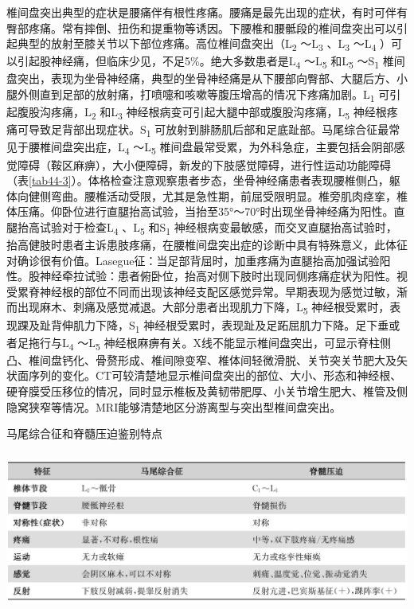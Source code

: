 椎间盘突出典型的症状是腰痛伴有根性疼痛。腰痛是最先出现的症状，有时可伴有臀部疼痛。常有摔倒、扭伤和提重物等诱因。下腰椎和腰骶段的椎间盘突出可以引起典型的放射至膝关节以下部位疼痛。高位椎间盘突出（L\textsubscript{2}
～L\textsubscript{3} 、L\textsubscript{3} ～L\textsubscript{4}
）可以引起股神经痛，但临床少见，不足5\%。绝大多数患者是L\textsubscript{4}
～L\textsubscript{5} 和L\textsubscript{5} ～S\textsubscript{1}
椎间盘突出，表现为坐骨神经痛，典型的坐骨神经痛是从下腰部向臀部、大腿后方、小腿外侧直到足部的放射痛，打喷嚏和咳嗽等腹压增高的情况下疼痛加剧。L\textsubscript{1}
可引起腹股沟疼痛，L\textsubscript{2} 和L\textsubscript{3}
神经根病变可引起大腿中部或腹股沟疼痛，L\textsubscript{5}
神经根疼痛可导致足背部出现症状。S\textsubscript{1}
可放射到腓肠肌后部和足底趾部。马尾综合征最常见于腰椎间盘突出症，L\textsubscript{4}
～L\textsubscript{5}
椎间盘最常受累，为外科急症，主要包括会阴部感觉障碍（鞍区麻痹），大小便障碍，新发的下肢感觉障碍，进行性运动功能障碍（表\ref{tab44-3}）。体格检查注意观察患者步态，坐骨神经痛患者表现腰椎侧凸，躯体向健侧弯曲。腰椎活动受限，尤其是急性期，前屈受限明显。椎旁肌肉痉挛，椎体压痛。仰卧位进行直腿抬高试验，当抬至35°～70°时出现坐骨神经痛为阳性。直腿抬高试验对于检查L\textsubscript{4}
、L\textsubscript{5} 和S\textsubscript{1}
神经根病变最敏感，而交叉直腿抬高试验时，抬高健肢时患者主诉患肢疼痛，在腰椎间盘突出症的诊断中具有特殊意义，此体征对确诊很有价值。Lasegue征：当足部背屈时，加重疼痛为直腿抬高加强试验阳性。股神经牵拉试验：患者俯卧位，抬高对侧下肢时出现同侧疼痛症状为阳性。视受累脊神经根的部位不同而出现该神经支配区感觉异常。早期表现为感觉过敏，渐而出现麻木、刺痛及感觉减退。大部分患者出现肌力下降，L\textsubscript{5}
神经根受累时，表现踝及趾背伸肌力下降，S\textsubscript{1}
神经根受累时，表现趾及足跖屈肌力下降。足下垂或者足拖行与L\textsubscript{4}
～L\textsubscript{5}
神经根麻痹有关。X线不能显示椎间盘突出，可显示脊柱侧凸、椎间盘钙化、骨赘形成、椎间隙变窄、椎体间轻微滑脱、关节突关节肥大及矢状面序列的变化。CT可较清楚地显示椎间盘突出的部位、大小、形态和神经根、硬脊膜受压移位的情况，同时显示椎板及黄韧带肥厚、小关节增生肥大、椎管及侧隐窝狭窄等情况。MRI能够清楚地区分游离型与突出型椎间盘突出。

\begin{table}[htbp]
\centering
\caption{马尾综合征和脊髓压迫鉴别特点}
\label{tab44-3}
\includegraphics[width=5.875in,height=2.07292in]{./images/Image00270.jpg}
\end{table}

